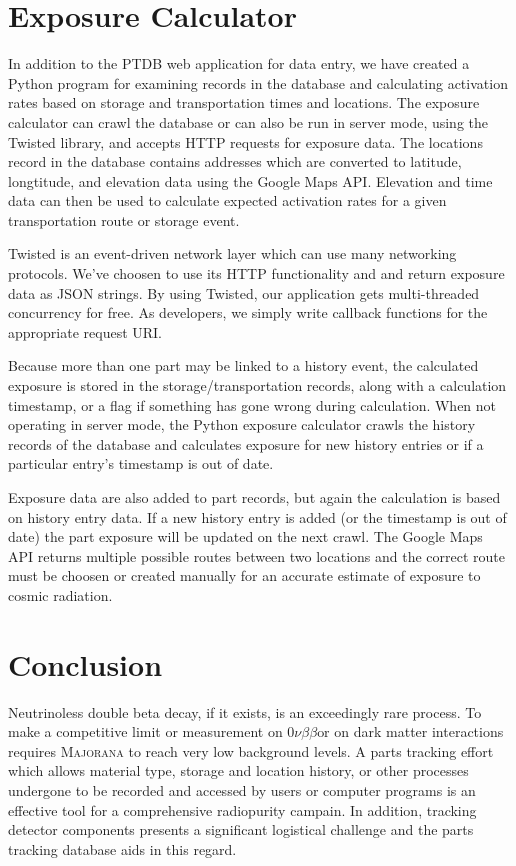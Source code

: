 \documentclass[journal]{IEEEtran}
\def\znbb{0$\nu\beta\beta$}
\begin{document}
\section{Exposure Calculator}

In addition to the PTDB web application for data entry, we have created a Python program for
examining records in the database and calculating activation rates based on storage and 
transportation times and locations. The exposure calculator can crawl the database or can
also be run in server mode, using the Twisted library, and accepts HTTP requests for
exposure data. The locations record in the database contains addresses which
are converted to latitude, longtitude, and elevation data using the Google Maps API. Elevation and time data can
then be used to calculate expected activation rates for a given transportation route
or storage event.

Twisted is an event-driven network layer which can use many networking protocols. We've 
choosen to use its HTTP functionality and and return exposure data as JSON strings. By
using Twisted, our application gets multi-threaded concurrency for free. As developers,
we simply write callback functions for the appropriate request URI.

Because more than one part may be linked to a history event, the calculated exposure is
stored in the storage/transportation records, along with a calculation timestamp, or a flag
if something has gone wrong during calculation. When not operating in server mode, the Python
exposure calculator crawls the history records of the database and calculates exposure for
new history entries or if a particular entry's timestamp is out of date. 

Exposure data are also added to part records, but again the calculation is based on history
entry data. If a new history entry is added (or the timestamp is out of date) the part
exposure will be updated on the next crawl. The Google Maps API returns multiple possible
routes between two locations and the correct route must be choosen or created
manually for an accurate estimate of exposure to cosmic radiation.

\section{Conclusion}

Neutrinoless double beta decay, if it exists, is an exceedingly rare process.
To make a competitive limit or measurement on \znbb or on dark matter interactions 
requires \textsc{Majorana} to reach very low background levels. A parts tracking effort which allows material type,
storage and location history, or other processes undergone to be recorded and
accessed by users or computer programs is an effective tool for a comprehensive
radiopurity campain. In addition, tracking detector components presents a significant
logistical challenge and the parts tracking database aids in this regard.
\end{document}
